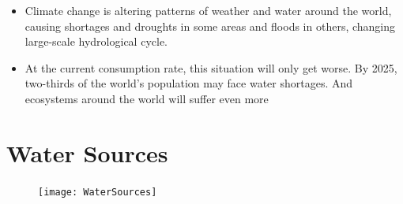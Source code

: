 \begin{itemize}
\item Climate change is altering patterns of weather and water around the world, causing shortages and droughts in some areas and floods in others, changing large-scale hydrological cycle.\\
\item At the current consumption rate, this situation will only get worse. By 2025, two-thirds of the world’s population may face water shortages. And ecosystems around the world will suffer even more\\
\end{itemize}


\section{Water Sources}
\begin{figure}
\begin{center}
\texttt{[image: WaterSources]}\\
\end{center}
\end{figure}

